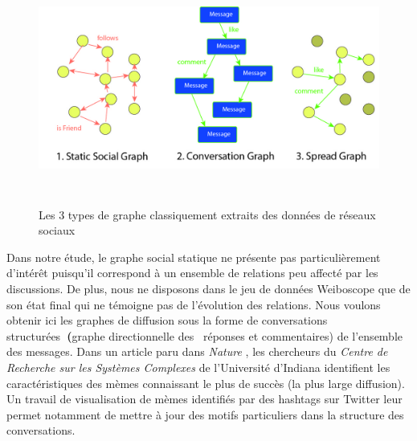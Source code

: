 \begin{figure}
    \centering
    \includegraphics[width=6.2894in,height=3.0004in]{figures/chap3/chapitre3-img9.jpg}
    \caption[3 modèles de réseau]{Les 3 types de graphe classiquement extraits des données de réseaux sociaux}
\end{figure}


Dans notre étude, le graphe social statique ne présente pas particulièrement d{\textquoteright}intér\^et puisqu{\textquoteright}il correspond à un ensemble de relations peu affecté par les discussions. De plus, nous ne disposons dans le jeu de données Weiboscope que de son état final qui ne témoigne pas de l{\textquoteright}évolution des relations. Nous voulons obtenir ici les graphes de diffusion sous la forme de conversations structurées\textbf{~(}graphe directionnelle des \ réponses et commentaires) de l{\textquoteright}ensemble des messages. Dans un article paru dans \textit{Nature} \citep{Weng2012}, les chercheurs du \textit{Centre de Recherche sur les Systèmes Complexes} de l{\textquoteright}Université d{\textquoteright}Indiana identifient les caractéristiques des mèmes connaissant le plus de succès (la plus large diffusion). Un travail de visualisation de mèmes identifiés par des hashtags sur Twitter leur permet notamment de mettre à jour des motifs particuliers dans la structure des conversations.


